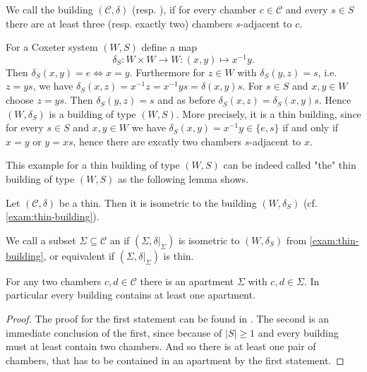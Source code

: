 \begin{defi}
	We call the building $(\mathcal{C}, \delta)$  (resp. ), if for every chamber $c \in \mathcal{C}$ and every $s \in S$ there are at least three (resp. exactly two) chambers $s$-adjacent to $c$.
\end{defi}

\begin{exam}
	For a Coxeter system $(W,S)$ define a map
	$$ \delta_S : W \times W \to W : (x,y) \mapsto x^{-1}y. $$
	Then $\delta_S(x,y) = e \iff x = y$. Furthermore for $z \in W$ with $\delta_S(y,z) = s$, i.e. $z = ys$, we have $\delta_S(x,z) = x^{-1}z = x^{-1}ys = \delta(x,y)s$. For $s \in S$ and $x,y \in W$ choose $z = ys$. Then $\delta_S(y,z) = s$ and as before $\delta_S(x,z) = \delta_S(x,y)s$. Hence $(W,\delta_S)$ is a building of type $(W,S)$. More precisely, it is a thin building, since for every $s \in S$ and $x,y \in W$ we have $\delta_S(x,y) = x^{-1}y \in \{e,s\}$ if and only if $x = y$ or $y = xs$, hence there are excatly two chambers $s$-adjacent to $x$.
\end{exam}

This example for a thin building of type $(W,S)$ can be indeed called "the" thin building of type $(W,S)$ as the following lemma shows.

\begin{lemm}
	Let $(\mathcal{C}, \delta)$ be a thin. Then it is isometric to the building $(W, \delta_S)$ (cf. \ref{exam:thin-building}).
\end{lemm}

\begin{defi}
	We call a subset $\Sigma \subseteq \mathcal{C}$ an  if $(\Sigma, \delta|_\Sigma)$ is isometric to $(W,\delta_S)$ from \ref{exam:thin-building}, or equivalent if $(\Sigma, \delta|_\Sigma)$ is thin.
\end{defi}

\begin{theo}
	For any two chambers $c,d \in \mathcal{C}$ there is an apartment $\Sigma$ with $c,d \in \Sigma$. In particular every building contains at least one apartment.

	\begin{proof}
		The proof for the first statement can be found in \cite[Theorem 11.2.5]{buekenhout:diagram-geometry}. The second is an immediate conclusion of the first, since because of $|S| \geq 1$ and  every building must at least contain two chambers. And so there is at least one pair of chambers, that has to be contained in an apartment by the first statement.
	\end{proof}
\end{theo}

